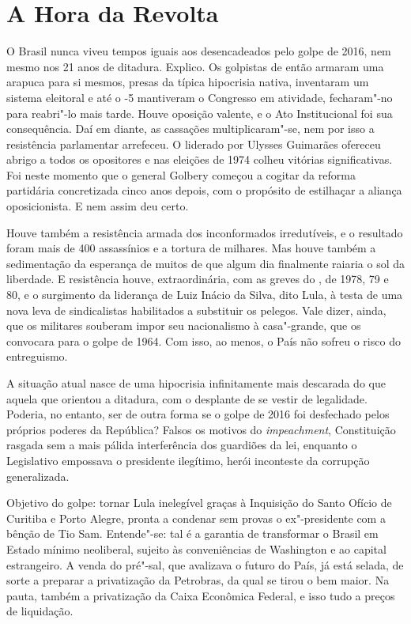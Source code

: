 \part{A Hora da Revolta}



O Brasil nunca viveu tempos iguais aos desencadeados pelo golpe de 2016,
nem mesmo nos 21 anos de ditadura. Explico. Os golpistas de então
armaram uma arapuca para si mesmos, presas da típica hipocrisia nativa,
inventaram um sistema eleitoral e até o -5 mantiveram o Congresso em
atividade, fecharam"-no para reabri"-lo mais tarde. Houve oposição
valente, e o Ato Institucional foi sua consequência. Daí em diante, as
cassações multiplicaram"-se, nem por isso a resistência parlamentar
arrefeceu. O  liderado por Ulysses Guimarães ofereceu abrigo a todos
os opositores e nas eleições de 1974 colheu vitórias significativas. Foi
neste momento que o general Golbery começou a cogitar da reforma
partidária concretizada cinco anos depois, com o propósito de estilhaçar
a aliança oposicionista. E nem assim deu certo.

Houve também a resistência armada dos inconformados irredutíveis, e o
resultado foram mais de 400 assassínios e a tortura de milhares. Mas
houve também a sedimentação da esperança de muitos de que algum dia
finalmente raiaria o sol da liberdade. E resistência houve,
extraordinária, com as greves do , de 1978, 79 e 80, e o surgimento
da liderança de Luiz Inácio da Silva, dito Lula, à testa de uma nova
leva de sindicalistas habilitados a substituir os pelegos. Vale dizer,
ainda, que os militares souberam impor seu nacionalismo à casa"-grande,
que os convocara para o golpe de 1964. Com isso, ao menos, o País não
sofreu o risco do entreguismo.

A situação atual nasce de uma hipocrisia infinitamente mais descarada do
que aquela que orientou a ditadura, com o desplante de se vestir de
legalidade. Poderia, no entanto, ser de outra forma se o golpe de 2016
foi desfechado pelos próprios poderes da República? Falsos os motivos do
\emph{impeachment}, Constituição rasgada sem a mais pálida interferência
dos guardiões da lei, enquanto o Legislativo empossava o presidente
ilegítimo, herói inconteste da corrupção generalizada.

Objetivo do golpe: tornar Lula inelegível graças à Inquisição do Santo
Ofício de Curitiba e Porto Alegre, pronta a condenar sem provas o
ex"-presidente com a bênção de Tio Sam. Entende"-se: tal é a garantia de
transformar o Brasil em Estado mínimo neoliberal, sujeito às
conveniências de Washington e ao capital estrangeiro. A venda do
pré"-sal, que avalizava o futuro do País, já está selada, de sorte a
preparar a privatização da Petrobras, da qual se tirou o bem maior. Na
pauta, também a privatização da Caixa Econômica Federal, e isso tudo a
preços de liquidação.


